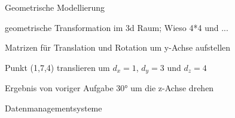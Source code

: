 \documentclass[
	ngerman,
	color = black,
	]{tudaexercise}
\begin{document}
\begin{task}[credit=9 P]{Geometrische Modellierung}
	\begin{subtask}[credit=2 P]
		geometrische Transformation im 3d Raum; Wieso 4*4 und ...
	\end{subtask}
	
	\begin{subtask}[credit=2 P]
		Matrizen für Translation und Rotation um y-Achse aufstellen
	\end{subtask}
		
	\begin{subtask}[credit=3 P]
		Punkt (1,7,4) translieren um $d_x=1$, $d_y=3$ und $d_z=4$
	\end{subtask}
	
	\begin{subtask}[credit=2 P]
		Ergebnis von voriger Aufgabe 30° um die z-Achse drehen
	\end{subtask}
\end{task}

\begin{task}[credit=15{,}5 P]{Datenmanagementsysteme}
	\begin{subtask}[credit=5 P]
		
	\end{subtask}
	
	\begin{subtask}[credit=2 P]
		
	\end{subtask}
	
	\begin{subtask}[credit=2{,}5 P]
		
	\end{subtask}
	
	\begin{subtask}[credit=4 P]
		
	\end{subtask}
	
	\begin{subtask}[credit=2 P]
		
	\end{subtask}
\end{task}
\end{document}
